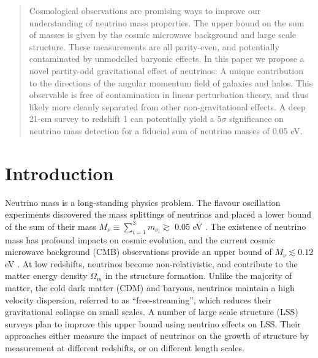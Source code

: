 \documentclass[aps,prd,twocolumn,amsmath,amssymb,amsfont,superscriptaddress,nofootinbib]{revtex4-1}
\begin{document}
\begin{abstract}
Cosmological observations are promising ways to improve our understanding of neutrino mass properties. The upper bound on the sum of masses is given by the cosmic microwave background and large scale structure. These measurements are all parity-even, and potentially contaminated by unmodelled baryonic effects. In this paper we propose a novel partity-odd gravitational effect of neutrinos: A unique contribution to the directions of the angular momentum field of galaxies and halos. This observable is free of contamination in linear perturbation theory, and thus likely more cleanly separated from other non-gravitational effects. A deep 21-cm survey to redshift 1 can potentially yield a $5\sigma$ significance on neutrino mass detection for a fiducial sum of neutrino masses of 0.05 eV.
\end{abstract}


\maketitle

\section{Introduction} 
Neutrino mass is a long-standing physics problem. 
The flavour oscillation experiments \citep{2002PhRvL..89a1301A} discovered the mass 
splittings of neutrinos and placed a lower bound of the sum of their mass 
$M_\nu \equiv \sum_{i=1}^3 m_{\nu_i} \gtrsim$ 0.05 eV \citep{2014ChPhC..38i0001O}. 
The existence of neutrino mass has profound impacts on cosmic evolution, and the current cosmic microwave background (CMB) observations provide an 
upper bound of $M_\nu\lesssim 0.12$ eV \citep{2018arXiv180706209P}. 
At low redshifts, neutrinos become non-relativistic, 
and contribute to the matter energy density $\Omega_m$ in the structure formation. 
Unlike the majority of matter, the cold dark matter (CDM) and baryons, 
neutrinos maintain a high velocity dispersion, 
referred to as ``free-streaming'', which reduces their gravitational collapse on small scales. 
A number of large scale structure (LSS) surveys \citep{2011arXiv1110.3193L,2015AAS...22533605E}
plan to improve this upper bound using neutrino effects on LSS. Their approaches either measure the impact of neutrinos on the growth of structure by measurement at different redshifts, or on different length scales.
\end{document}
